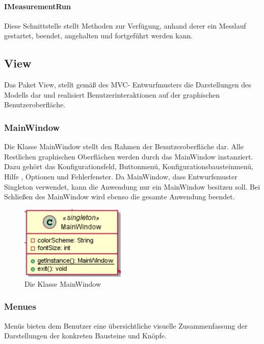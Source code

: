 \documentclass[parskip=full]{scrartcl}
\begin{document}
\paragraph{IMeasurementRun}

Diese Schnittstelle stellt Methoden zur Verfügung, anhand derer ein Messlauf gestartet, beendet, angehalten und fortgeführt werden kann.

\clearpage
\subsection{View}
Das Paket View, stellt gemäß des MVC- Entwurfmusters die Darstellungen des Modells dar und realisiert Benutzerinteraktionen auf der graphischen Benutzeroberfläche. 

\subsubsection{MainWindow} 
Die Klasse MainWindow stellt den Rahmen der Benutzeroberfläche dar. Alle Restlichen graphischen Oberflächen werden durch das MainWindow instanziert. Dazu gehört das Konfigurationsfeld, Buttonmenü, Konfigurationsbausteinmenü, Hilfe , Optionen und Fehlerfenster. 
Da MainWindow, dass Entwurfsmuster Singleton verwendet, kann die Anwendung nur ein MainWindow besitzen soll.
Bei Schließen des MainWindow wird ebenso die gesamte Anwendung beendet.

\begin{figure}[htbp]
	\begin{center}
		\includegraphics[width = 5cm]{Grafiken/MainWindow.png}
		\caption{Die Klasse MainWindow}
		\label{Entwurf_Grob}
	\end{center}
\end{figure}

\newpage

\subsubsection{Menues}

Menüs bieten dem Benutzer eine übersichtliche visuelle Zusammenfassung der Darstellungen der konkreten Bausteine und Knöpfe. 
\end{document}
